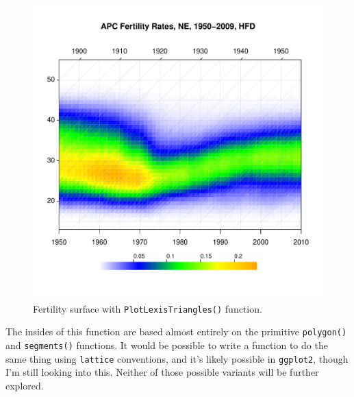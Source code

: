 \documentclass[a4paper]{article}
\begin{document}
\begin{figure}[H]
\centering
\includegraphics[width=4.5in,height=4.5in]{figs/lextri.pdf}
\caption{Fertility surface with \texttt{PlotLexisTriangles()} function.}
\end{figure}

The insides of this function are based almost entirely on the primitive \texttt{polygon()} and \texttt{segments()} functions. It would be possible to write a function to do the same thing using \texttt{lattice} conventions, and it's likely possible in \texttt{ggplot2}, though I'm still looking into this. Neither of those possible variants will be further explored.
\end{document}

